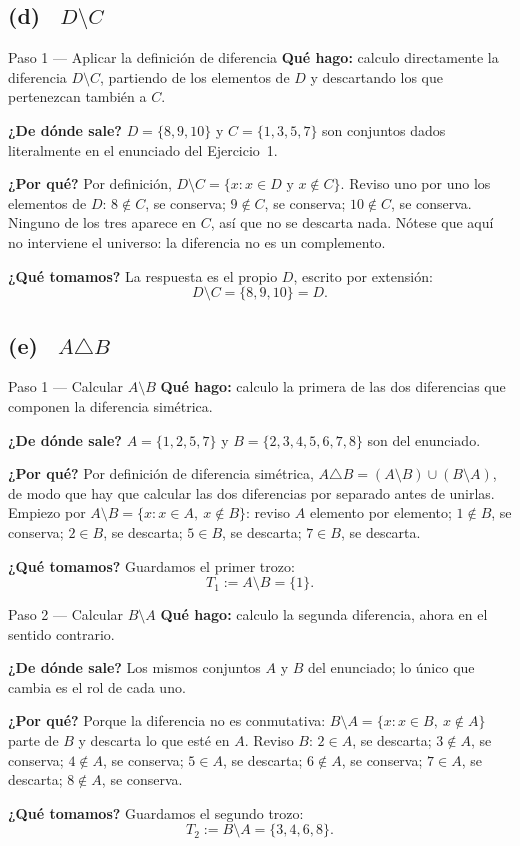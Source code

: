 \documentclass[11pt]{article}
\begin{document}
\subsection*{(d) \ $D\setminus C$}

\begin{paso}{Paso 1 --- Aplicar la definición de diferencia}
\textbf{Qué hago:} calculo directamente la diferencia $D\setminus C$, partiendo de los
elementos de $D$ y descartando los que pertenezcan también a $C$.

\textbf{¿De dónde sale?} $D=\{8,9,10\}$ y $C=\{1,3,5,7\}$ son conjuntos dados literalmente en
el enunciado del Ejercicio~1.

\textbf{¿Por qué?} Por definición, $D\setminus C=\{x: x\in D \text{ y } x\notin C\}$. Reviso
uno por uno los elementos de $D$: $8\notin C$, se conserva; $9\notin C$, se conserva;
$10\notin C$, se conserva. Ninguno de los tres aparece en $C$, así que no se descarta nada.
Nótese que aquí no interviene el universo: la diferencia no es un complemento.

\textbf{¿Qué tomamos?} La respuesta es el propio $D$, escrito por extensión:
\[
D\setminus C=\{8,9,10\}=D.
\]
\end{paso}

\subsection*{(e) \ $A\triangle B$}

\begin{paso}{Paso 1 --- Calcular $A\setminus B$}
\textbf{Qué hago:} calculo la primera de las dos diferencias que componen la diferencia
simétrica.

\textbf{¿De dónde sale?} $A=\{1,2,5,7\}$ y $B=\{2,3,4,5,6,7,8\}$ son del enunciado.

\textbf{¿Por qué?} Por definición de diferencia simétrica,
$A\triangle B=(A\setminus B)\cup(B\setminus A)$, de modo que hay que calcular las dos
diferencias por separado antes de unirlas. Empiezo por $A\setminus B=\{x: x\in A,\ x\notin
B\}$: reviso $A$ elemento por elemento; $1\notin B$, se conserva; $2\in B$, se descarta;
$5\in B$, se descarta; $7\in B$, se descarta.

\textbf{¿Qué tomamos?} Guardamos el primer trozo:
\[
T_1:=A\setminus B=\{1\}.
\]
\end{paso}

\begin{paso}{Paso 2 --- Calcular $B\setminus A$}
\textbf{Qué hago:} calculo la segunda diferencia, ahora en el sentido contrario.

\textbf{¿De dónde sale?} Los mismos conjuntos $A$ y $B$ del enunciado; lo único que cambia es
el rol de cada uno.

\textbf{¿Por qué?} Porque la diferencia no es conmutativa: $B\setminus A=\{x: x\in B,\
x\notin A\}$ parte de $B$ y descarta lo que esté en $A$. Reviso $B$: $2\in A$, se descarta;
$3\notin A$, se conserva; $4\notin A$, se conserva; $5\in A$, se descarta; $6\notin A$, se
conserva; $7\in A$, se descarta; $8\notin A$, se conserva.

\textbf{¿Qué tomamos?} Guardamos el segundo trozo:
\[
T_2:=B\setminus A=\{3,4,6,8\}.
\]
\end{paso}
\end{document}
